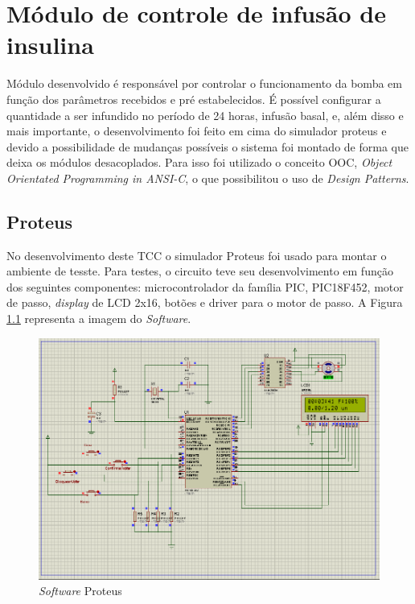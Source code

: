 \chapter{Módulo de controle de infusão de insulina}
\label{cap:oraganizacao_software}
Módulo desenvolvido é responsável por controlar o funcionamento da bomba em função dos parâmetros recebidos e pré estabelecidos. É possível configurar a quantidade a ser infundido no período de 24 horas, infusão basal, e, além disso e mais importante, o desenvolvimento foi feito em cima do simulador proteus e devido a possibilidade de mudanças possíveis o sistema foi montado de forma que deixa os módulos desacoplados. Para isso foi utilizado o conceito OOC, \emph{Object Orientated Programming in ANSI-C}, o que possibilitou o uso de \emph{Design Patterns}.

\section{Proteus}

No desenvolvimento deste TCC o simulador Proteus foi usado para montar o ambiente de tesste. Para testes, o circuito teve seu desenvolvimento em função dos seguintes componentes: microcontrolador da família PIC, PIC18F452, motor de passo, \emph{display} de LCD 2x16, botões e driver para o motor de passo. A Figura \ref{fig:proteus} representa a imagem do \emph{Software}.

\begin{figure}[htp]
	\centering
	\includegraphics[scale=0.5]{images/proteus.png}
	\caption{\emph{Software} Proteus}	
	\label{fig:proteus}
\end{figure}

